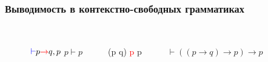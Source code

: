 \documentclass{beamer}
\begin{document}
	\begin{frame}
    \frametitle{Выводимость в контекстно-свободных грамматиках}
           
    \begin{columns}
       \\\noindent\rule{1.5cm}{0.4pt}\\
         $\textcolor{blue}{\vdash} p \textcolor{red}{\rightarrow} q, p$
         \hspace{0.7cm} $p \vdash p$
         \\\noindent\rule{3cm}{0.4pt}\\
          \hspace{3mm} (p \rightarrow q) \textcolor{red}{\rightarrow p}  \textcolor{blue}{\vdash} p\\
          \noindent\rule{4cm}{0.4pt}
          \\\hspace{3mm}$\vdash ((p \rightarrow q) \rightarrow p) \rightarrow p$
          

\end{columns}
\end{frame}
\end{document}
